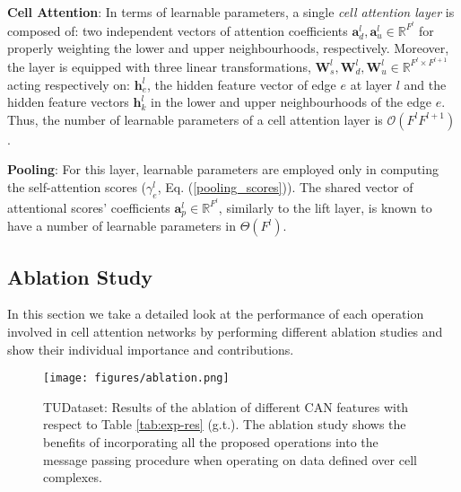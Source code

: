 \documentclass{article}
\begin{document}
\textbf{Cell Attention}: In terms of learnable parameters, a single \emph{cell attention layer} is composed of: two independent vectors of attention coefficients $\mathbf{a}_d^l, \mathbf{a}_u^l \in \mathbb{R}^{F^{l}}$ for properly weighting the lower and upper neighbourhoods, respectively. Moreover, the layer is equipped with three linear transformations, $\mathbf{W}_s^l, \mathbf{W}_d^l, \mathbf{W}_u^l \in \mathbb{R}^{F^{l} \times F^{l+1}}$ acting respectively on: $\mathbf{h}_e^l$, the hidden feature vector of edge $e$ at layer $l$ and the hidden feature vectors $\mathbf{h}_k^l$ in the lower and upper neighbourhoods of the edge $e$. Thus, the number of learnable parameters of a cell attention layer is $\mathcal{O}(F^{l} F^{l+1})$.

\textbf{Pooling}: For this layer, learnable parameters are employed only in computing the self-attention scores ($\gamma_e^l$, Eq. (\ref{pooling_scores})). The shared vector of attentional scores' coefficients $\mathbf{a}_p^l \in \mathbb{R}^{F^{l}}$, similarly to the lift layer, is known to have a number of learnable parameters in $\Theta \left( F^{l} \right)$.


\subsection{Ablation Study}\label{sec:ablation}

In this section we take a detailed look at the performance of each operation involved in cell attention networks by performing different ablation studies and show their individual importance and contributions. 



\begin{figure}[!htb]
    \centering
    \texttt{[image: figures/ablation.png]}
    \caption{TUDataset: Results of the ablation of different CAN features with respect to Table \ref{tab:exp-res} (g.t.). The ablation study shows the benefits of incorporating all the proposed operations into the message passing procedure when operating on data defined over cell complexes.}
    \label{fig:ablation}
\end{figure}
\end{document}
